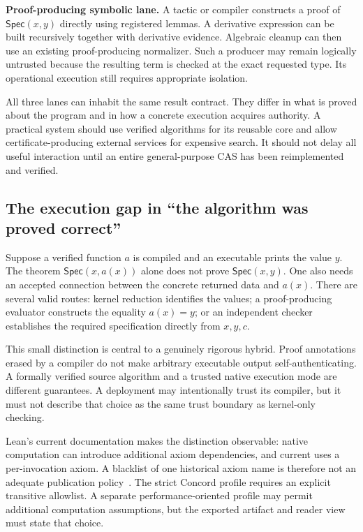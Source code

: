 \documentclass[11pt,a4paper]{article}
\newcommand{\code}[1]{\texttt{\detokenize{#1}}}
\newcommand{\Spec}{\mathsf{Spec}}
\theoremstyle{remark}
\begin{document}
\textbf{Proof-producing symbolic lane.} A tactic or compiler constructs a proof
of $\Spec(x,y)$ directly using registered lemmas. A derivative expression can be
built recursively together with derivative evidence. Algebraic cleanup can then
use an existing proof-producing normalizer. Such a producer may remain logically
untrusted because the resulting term is checked at the exact requested type.
Its operational execution still requires appropriate isolation.

All three lanes can inhabit the same result contract. They differ in what is
proved about the program and in how a concrete execution acquires authority.
A practical system should use verified algorithms for its reusable core and
allow certificate-producing external services for expensive search. It should
not delay all useful interaction until an entire general-purpose CAS has been
reimplemented and verified.

\subsection{The execution gap in ``the algorithm was proved correct''}
Suppose a verified function $a$ is compiled and an executable prints the value
$y$. The theorem $\Spec(x,a(x))$ alone does not prove $\Spec(x,y)$. One also needs
an accepted connection between the concrete returned data and $a(x)$.
There are several valid routes: kernel reduction identifies the values; a
proof-producing evaluator constructs the equality $a(x)=y$; or an independent
checker establishes the required specification directly from $x,y,c$.

This small distinction is central to a genuinely rigorous hybrid. Proof
annotations erased by a compiler do not make arbitrary executable output
self-authenticating. A formally verified source algorithm and a trusted native
execution mode are different guarantees. A deployment may intentionally trust
its compiler, but it must not describe that choice as the same trust boundary
as kernel-only checking.

Lean's current documentation makes the distinction observable: native computation
can introduce additional axiom dependencies, and current \code{native_decide}
uses a per-invocation axiom. A blacklist of one historical axiom name is therefore
not an adequate publication policy~\cite{leanaxioms}. The strict Concord profile
requires an explicit transitive allowlist. A separate performance-oriented profile
may permit additional computation assumptions, but the exported artifact and
reader view must state that choice.
\end{document}
